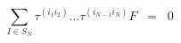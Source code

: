 \begin{equation}
\sum_{I \in S_N} \tau^{( i_1
i_2 )} ... \tau^{( i_{N-1} i_N )} F \;\; =\;\; 0
\label{eq:4.25}
\end{equation}

